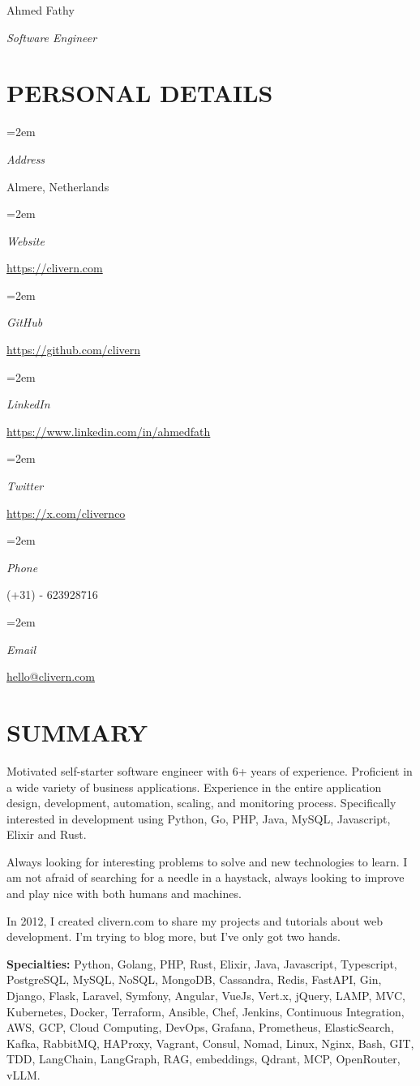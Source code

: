 \documentclass[paper=a4,fontsize=11pt]{scrartcl} %
\newlength{\spacebox}
\newcommand{\sepspace}{\vspace*{1em}}		%
\newcommand{\MyName}[1]{ %
		\Huge \usefont{OT1}{phv}{b}{n} \hfill #1
		\par \normalsize \normalfont}
\newcommand{\MySlogan}[1]{ %
		\large \usefont{OT1}{phv}{m}{n}\hfill \textit{#1}
		\par \normalsize \normalfont}
\newcommand{\NewPart}[1]{\section*{\uppercase{#1}}}
\newcommand{\PersonalEntry}[2]{
		\noindent\hangindent=2em\hangafter=0 %
		\parbox{\spacebox}{        %
		\textit{#1}}		       %
		\hspace{1.5em} #2 \par}    %
\begin{document}

\MyName{Ahmed Fathy}
\MySlogan{Software Engineer}

\sepspace


\NewPart{Personal details}{}

\PersonalEntry{Address}{Almere, Netherlands}
\PersonalEntry{Website}{\url{https://clivern.com}}
\PersonalEntry{GitHub}{\url{https://github.com/clivern}}
\PersonalEntry{LinkedIn}{\url{https://www.linkedin.com/in/ahmedfath}}
\PersonalEntry{Twitter}{\url{https://x.com/clivernco}}
\PersonalEntry{Phone}{(+31) - 623928716}
\PersonalEntry{Email}{\url{hello@clivern.com}}


\NewPart{Summary}{}

Motivated self-starter software engineer with 6+ years of experience. Proficient in a wide variety of business applications. Experience in the entire application design, development, automation, scaling, and monitoring process.
Specifically interested in development using Python, Go, PHP, Java, MySQL, Javascript, Elixir and Rust.

\sepspace

Always looking for interesting problems to solve and new technologies to learn. I am not afraid of searching for a needle in a haystack, always looking to improve and play nice with both humans and machines.

\sepspace

In 2012, I created clivern.com to share my projects and tutorials about web development. I'm trying to blog more, but I've only got two hands.

\sepspace

\textbf{Specialties:} Python, Golang, PHP, Rust, Elixir, Java, Javascript, Typescript, PostgreSQL, MySQL, NoSQL, MongoDB, Cassandra, Redis, FastAPI, Gin, Django, Flask, Laravel, Symfony, Angular, VueJs, Vert.x, jQuery, LAMP, MVC, Kubernetes, Docker, Terraform, Ansible, Chef, Jenkins, Continuous Integration, AWS, GCP, Cloud Computing, DevOps, Grafana, Prometheus, ElasticSearch, Kafka, RabbitMQ, HAProxy, Vagrant, Consul, Nomad, Linux, Nginx, Bash, GIT, TDD, LangChain, LangGraph, RAG, embeddings, Qdrant, MCP, OpenRouter, vLLM.
\end{document}
